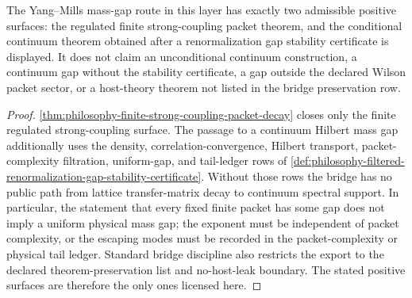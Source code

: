 \begin{theorem}
\label{thm:philosophy-yang-mills-mass-gap-bridge-boundary}
The Yang--Mills mass-gap route in this layer has exactly two admissible
positive surfaces: the regulated finite strong-coupling packet theorem, and
the conditional continuum theorem obtained after a renormalization gap
stability certificate is displayed. It does not claim an unconditional
continuum construction, a continuum gap without the stability certificate, a
gap outside the declared Wilson packet sector, or a host-theory theorem not
listed in the bridge preservation row.
\end{theorem}
\begin{proof}
\autoref{thm:philosophy-finite-strong-coupling-packet-decay} closes only the
finite regulated strong-coupling surface. The passage to a continuum Hilbert
mass gap additionally uses the density, correlation-convergence, Hilbert
transport, packet-complexity filtration, uniform-gap, and tail-ledger rows
of \autoref{def:philosophy-filtered-renormalization-gap-stability-certificate}.
Without those rows the bridge has no public path from lattice transfer-matrix
decay to continuum spectral support. In particular, the statement that every
fixed finite packet has some gap does not imply a uniform physical mass gap;
the exponent must be independent of packet complexity, or the escaping modes
must be recorded in the packet-complexity or physical tail ledger. Standard
bridge discipline also restricts the export to the declared
theorem-preservation list and no-host-leak boundary. The stated positive
surfaces are therefore the only ones licensed here.
\end{proof}
